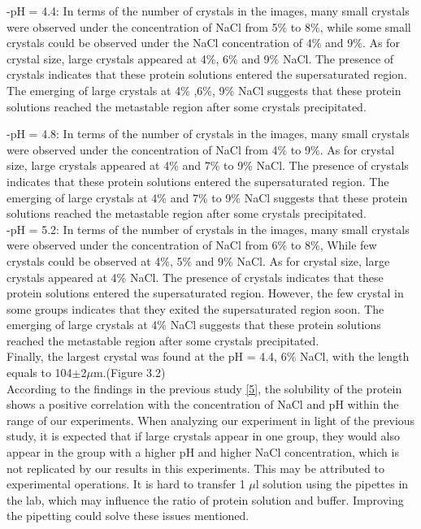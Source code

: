 \documentclass[a4paper,english,12pt,bibliography=totoc]{scrreprt}
\begin{document}
-pH = 4.4: In terms of the number of crystals in the images, many small crystals were observed under the concentration of NaCl from 5\% to 8\%, while some small crystals could be observed under the NaCl concentration of 4\% and 9\%. As for crystal size, large crystals appeared at 4\%, 6\% and 9\% NaCl. The presence of crystals indicates that these protein solutions entered the supersaturated region. The emerging of large crystals at 4\% ,6\%, 9\% NaCl suggests that these protein solutions reached the metastable region after some crystals precipitated.



-pH = 4.8: In terms of the number of crystals in the images, many small crystals were observed under the concentration of NaCl from 4\% to 9\%. As for crystal size, large crystals appeared at 4\% and 7\% to 9\% NaCl. The presence of crystals indicates that these protein solutions entered the supersaturated region. The emerging of large crystals at 4\% and 7\% to 9\% NaCl suggests that these protein solutions reached the metastable region after some crystals precipitated.\\


-pH = 5.2: In terms of the number of crystals in the images, many small crystals were observed under the concentration of NaCl from 6\% to 8\%, While few crystals could be observed at 4\%, 5\% and 9\% NaCl. As for crystal size, large crystals appeared at 4\% NaCl. The presence of crystals indicates that these protein solutions entered the supersaturated region. However, the few crystal in some groups indicates that they exited the supersaturated region soon. The emerging of large crystals at 4\% NaCl suggests that these protein solutions reached the metastable region after some crystals precipitated.\\

Finally, the largest crystal was found at the pH = 4.4, 6\% NaCl, with the length equals to 104$\pm $2$\mu$m.(Figure 3.2)\\

According to the findings in the previous study \hyperref[sec:ref_5]{[5]}, the solubility of the protein shows a positive correlation with the concentration of NaCl and pH within the range of our experiments. When analyzing our experiment in light of the previous study, it is expected that if large crystals appear in one group, they would also appear in the group with a higher pH and higher NaCl concentration,  which is not replicated by our results in this experiments. This may be attributed to experimental operations. It is hard to transfer 1 $\mu$l solution using the pipettes in the lab, which may influence the ratio of protein solution and buffer. Improving the pipetting could solve these issues mentioned.
\end{document}
